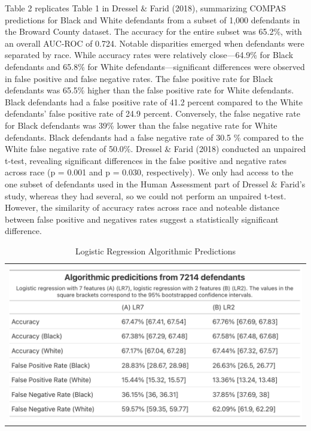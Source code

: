 \documentclass[12pt, ]{article}
\begin{document}
Table 2 replicates Table 1 in Dressel \& Farid (2018), summarizing
COMPAS predictions for Black and White defendants from a subset of 1,000
defendants in the Broward County dataset. The accuracy for the entire
subset was 65.2\%, with an overall AUC-ROC of 0.724. Notable disparities
emerged when defendants were separated by race. While accuracy rates
were relatively close---64.9\% for Black defendants and 65.8\% for White
defendants---significant differences were observed in false positive and
false negative rates. The false positive rate for Black defendants was
65.5\% higher than the false positive rate for White defendants. Black
defendants had a false positive rate of 41.2 percent compared to the
White defendants' false positive rate of 24.9 percent. Conversely, the
false negative rate for Black defendants was 39\% lower than the false
negative rate for White defendants. Black defendants had a false
negative rate of 30.5 \% compared to the White false negative rate of
50.0\%. Dressel \& Farid (2018) conducted an unpaired t-test, revealing
significant differences in the false positive and negative rates across
race (p = 0.001 and p = 0.030, respectively). We only had access to the
one subset of defendants used in the Human Assessment part of Dressel \&
Farid's study, whereas they had several, so we could not perform an
unpaired t-test. However, the similarity of accuracy rates across race
and noteable distance between false positive and negatives rates suggest
a statistically significant difference.

\hypertarget{tbl-3}{}
\begin{longtable}[]{@{}l@{}}
\caption{\label{tbl-3}Logistic Regression Algorithmic
Predictions}\tabularnewline
\toprule\noalign{}
\endfirsthead
\endhead
\bottomrule\noalign{}
\endlastfoot
\includegraphics{tables/tbl3.png} \\
\end{longtable}
\end{document}
